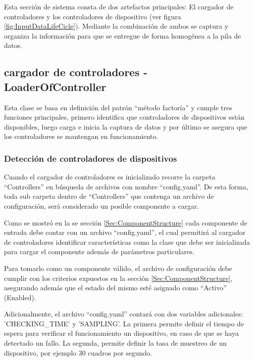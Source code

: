     Esta sección de sistema consta de dos artefactos principales: El cargador de controladores y los controladores de dispositivo (ver figura \ref{fig:InputDataLifeCicle}). Mediante la combinación de ambos se captura y organiza la información para que se entregue de forma homogénea a la pila de datos. 
    
    \subsection{ cargador de controladores - LoaderOfController}
    \label{LoaderController}
        Esta clase se basa en definición del patrón ``método factoría'' y cumple tres funciones principales, primero identifica que controladores de dispositivos están disponibles, luego carga e inicia la captura de datos y por último se asegura que los controladores se mantengan en funcionamiento.
        
        \subsubsection{Detección de controladores de dispositivos}
        \label{sub2:InputDeviceDetection}
            Cuando el cargador de controladores es inicializado recorre la carpeta ``Controllers'' en búsqueda de archivos con nombre ``config.yaml''. De esta forma, toda sub carpeta dentro de ``Controllers'' que contenga un archivo de configuración, será considerado un posible componente a cargar.
            
            Como se mostró en la se sección \ref{Sec:ComponentStructure} cada componente de entrada debe contar con un archivo ``config.yaml'', el cual permitirá al cargador de controladores identificar características como la clase que debe ser inicializada para cargar el componente además de parámetros particulares.
            
            Para tomarlo como un componente válido, el archivo de configuración debe cumplir con los criterios expuestos en la sección \ref{Sec:ComponentStructure}, asegurando además que el estado del mismo esté asignado como ``Activo'' (Enabled). 
            
            Adicionalmente, el archivo ``config.yaml'' contará con dos variables adicionales: 'CHECKING\_TIME' y 'SAMPLING'. La primera permite definir el tiempo de espera para verificar el funcionamiento un dispositivo, en caso de que se haya detectado un fallo. La segunda, permite definir la tasa de muestreo de un dispositivo, por ejemplo 30 cuadros por segundo. 
        
